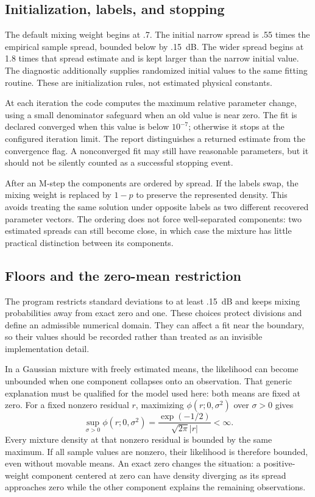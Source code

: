 \documentclass[conference,letterpaper]{IEEEtran}
\begin{document}
\subsection{Initialization, labels, and stopping}
The default mixing weight begins at .7. The initial narrow spread is .55 times the empirical sample spread, bounded below by .15~dB. The wider spread begins at 1.8 times that spread estimate and is kept larger than the narrow initial value. The diagnostic additionally supplies randomized initial values to the same fitting routine. These are initialization rules, not estimated physical constants.

At each iteration the code computes the maximum relative parameter change, using a small denominator safeguard when an old value is near zero. The fit is declared converged when this value is below $10^{-7}$; otherwise it stops at the configured iteration limit. The report distinguishes a returned estimate from the convergence flag. A nonconverged fit may still have reasonable parameters, but it should not be silently counted as a successful stopping event.

After an M-step the components are ordered by spread. If the labels swap, the mixing weight is replaced by $1-p$ to preserve the represented density. This avoids treating the same solution under opposite labels as two different recovered parameter vectors. The ordering does not force well-separated components: two estimated spreads can still become close, in which case the mixture has little practical distinction between its components.

\subsection{Floors and the zero-mean restriction}
The program restricts standard deviations to at least .15~dB and keeps mixing probabilities away from exact zero and one. These choices protect divisions and define an admissible numerical domain. They can affect a fit near the boundary, so their values should be recorded rather than treated as an invisible implementation detail.

In a Gaussian mixture with freely estimated means, the likelihood can become unbounded when one component collapses onto an observation. That generic explanation must be qualified for the model used here: both means are fixed at zero. For a fixed nonzero residual $r$, maximizing $\phi(r;0,\sigma^2)$ over $\sigma>0$ gives
\begin{equation}
\sup_{\sigma>0}\phi(r;0,\sigma^2)
=\frac{\exp(-1/2)}{\sqrt{2\pi}|r|}<\infty.
\end{equation}
Every mixture density at that nonzero residual is bounded by the same maximum. If all sample values are nonzero, their likelihood is therefore bounded, even without movable means. An exact zero changes the situation: a positive-weight component centered at zero can have density diverging as its spread approaches zero while the other component explains the remaining observations.
\end{document}
